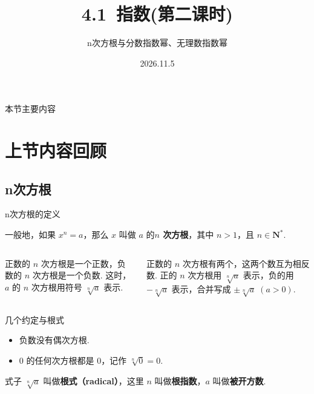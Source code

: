 \documentclass[aspectratio=169,13pt,t,fleqn] {beamer}
\title[4.1指数]{4.1\ 指数(第二课时)}
\subtitle{n次方根与分数指数幂、无理数指数幂}
\author[好好学习，努力向上]{}
\institute{}
\date{2026.11.5}
\theoremstyle{definition}
\begin{document}
\begin{frame}{}
	\titlepage
\end{frame}

\begin{frame}{本节主要内容}
	\tableofcontents
\end{frame}

\section{上节内容回顾}
\subsection{n次方根}


\begin{frame}{n次方根的定义}
	\begin{summarybox}[n次方根]
		一般地，如果 \(x^n=a\)，那么 \(x\) 叫做 \(a\) 的\textbf{\(n\) 次方根}，其中 \(n>1\)，且 \(n\in \mathbf{N}^{*}\).
	\end{summarybox}
	\vspace{1em}
	\begin{columns}
		\begin{summarybox}
			正数的 \(n\) 次方根是一个正数，负数的 \(n\) 次方根是一个负数. 这时，\(a\) 的 \(n\) 次方根用符号 \(\sqrt[n]{a}\) 表示.
		\end{summarybox}
		\begin{summarybox}
			正数的 \(n\) 次方根有两个，这两个数互为相反数. 正的 \(n\) 次方根用 \(\sqrt[n]{a}\) 表示，负的用 \(-\sqrt[n]{a}\) 表示，合并写成 \(\pm\sqrt[n]{a}\;(a>0)\).
		\end{summarybox}
	\end{columns}
\end{frame}

\begin{frame}{几个约定与根式}
	\begin{summarybox}[注意]
		\begin{itemize}
			\item 负数没有偶次方根.
			\item \(0\) 的任何次方根都是 \(0\)，记作 \(\sqrt[n]{0}=0\).
		\end{itemize}
	\end{summarybox}

	\begin{summarybox-answer}
		式子 \(\sqrt[n]{a}\) 叫做\textbf{根式（radical）}，这里 \(n\) 叫做\textbf{根指数}，\(a\) 叫做\textbf{被开方数}.
	\end{summarybox-answer}
\end{frame}
\end{document}
